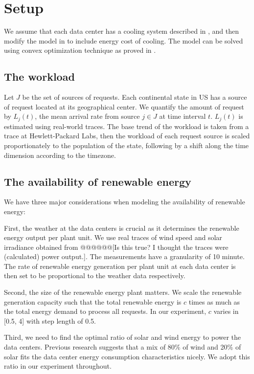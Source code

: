 \documentclass{acm_proc_article-sp}
\begin{document}
\section{Setup}
We assume that each data center has a cooling system described in \cite{adam:cooling}, and then modify the model in \cite{adam:GLB} to include energy cost of cooling. The model can be solved using convex optimization technique as proved in \cite{adam:GLBfull}.
\subsection{The workload}
Let $J$ be the set of sources of requests. Each continental state in US has a source of request located at its geographical center. We quantify the amount of request by $L_j(t)$, the mean arrival rate from source $j \in J$ at time interval $t$. $L_j(t)$ is estimated using real-world traces. The base trend of the workload is taken from a trace at Hewlett-Packard Labs, then the workload of each request source is scaled proportionately to the population of the state, following by a shift along the time dimension according to the timezone.

\subsection{The availability of renewable energy}
We have three major considerations when modeling the availability of renewable energy:

First, the weather at the data centers is crucial as it determines the renewable energy output per plant unit. We use real traces of wind speed and solar irradiance obtained from \cite{renew1} \cite{renew2} @@@@@@[Is this true? I thought the traces were (calculated) power output.]. The measurements have a granularity of 10 minute. The rate of renewable energy generation per plant unit at each data center is then set to be proportional to the weather data respectively.

Second, the size of the renewable energy plant matters. We scale the renewable generation capacity such that the total renewable energy is $c$ times as much as the total energy demand to process all requests. In our experiment, $c$ varies in [0.5, 4] with step length of 0.5.

Third, we need to find the optimal ratio of solar and wind energy to power the data centers. Previous research \cite{adam:GLB} suggests that a mix of 80\% of wind and 20\% of solar fits the data center energy consumption characteristics nicely. We adopt this ratio in our experiment throughout.
\end{document}
